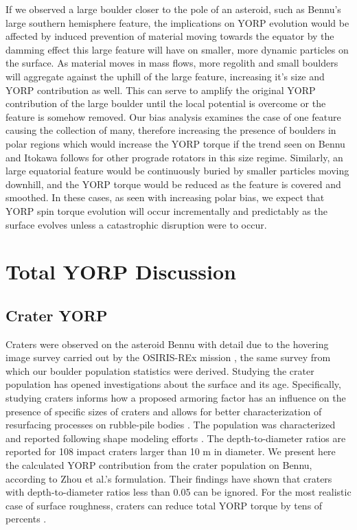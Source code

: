 If we observed a large boulder closer to the pole of an asteroid, such as Bennu's large southern hemisphere feature, the implications on YORP evolution would be affected by induced prevention of material moving towards the equator by the damming effect this large feature will have on smaller, more dynamic particles on the surface. As material moves in mass flows, more regolith and small boulders will aggregate against the uphill of the large feature, increasing it's size and YORP contribution as well. This can serve to amplify the original YORP contribution of the large boulder until the local potential is overcome or the feature is somehow removed. Our bias analysis examines the case of one feature causing the collection of many, therefore increasing the presence of boulders in polar regions which would increase the YORP torque if the trend seen on Bennu and Itokawa follows for other prograde rotators in this size regime. Similarly, an large equatorial feature would be continuously buried by smaller particles moving downhill, and the YORP torque would be reduced as the feature is covered and smoothed. In these cases, as seen with increasing polar bias, we expect that YORP spin torque evolution will occur incrementally and predictably as the surface evolves unless a catastrophic disruption were to occur. 

\section{Total YORP Discussion}\label{discussion}
\subsection{Crater YORP}
Craters were observed on the asteroid Bennu with detail due to the hovering image survey carried out by the OSIRIS-REx mission \cite{Walsh2019}, the same survey from which our boulder population statistics were derived. Studying the crater population has opened investigations about the surface and its age. Specifically, studying craters informs how a proposed armoring factor has an influence on the presence of specific sizes of craters and allows for better characterization of resurfacing processes on rubble-pile bodies \cite{Bierhaus2022}.  The population was characterized and reported following shape modeling efforts \cite{Daly2020a}. The depth-to-diameter ratios are reported for 108 impact craters larger than 10 m in diameter.  We present here the calculated YORP contribution from the crater population on Bennu, according to Zhou et al.'s formulation. Their findings have shown that craters with depth-to-diameter ratios less than 0.05 can be ignored. For the most realistic case of surface roughness, craters can reduce total YORP torque by tens of percents \cite{Zhou2023}. 

